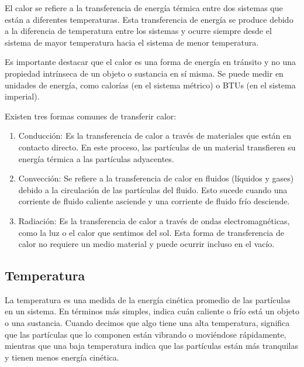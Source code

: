 \documentclass[letterpaper, 12pt]{article}
\begin{document}
El calor se refiere a la transferencia de energía térmica
entre dos sistemas que están a diferentes temperaturas.
Esta transferencia de energía se produce debido a la
diferencia de temperatura entre los sistemas y ocurre
siempre desde el sistema de mayor temperatura hacia el
sistema de menor temperatura.

Es importante destacar que el calor es una forma de energía
en tránsito y no una propiedad intrínseca de un objeto o
sustancia en sí misma. Se puede medir en unidades de
energía, como calorías (en el sistema métrico) o BTUs (en
el sistema imperial).

Existen tres formas comunes de transferir calor:

\begin{enumerate}
      \item Conducción: Es la transferencia de calor a través de
            materiales que están en contacto directo. En este proceso,
            las partículas de un material transfieren su energía
            térmica a las partículas adyacentes.

      \item Convección: Se refiere a la transferencia de calor en
            fluidos (líquidos y gases) debido a la circulación de las
            partículas del fluido. Esto sucede cuando una corriente de
            fluido caliente asciende y una corriente de fluido frío
            desciende.

      \item Radiación: Es la transferencia de calor a través de ondas
            electromagnéticas, como la luz o el calor que sentimos del
            sol. Esta forma de transferencia de calor no requiere un
            medio material y puede ocurrir incluso en el vacío.
\end{enumerate}

\subsection{Temperatura}

La temperatura es una medida de la energía cinética
promedio de las partículas en un sistema. En términos más
simples, indica cuán caliente o frío está un objeto o una
sustancia. Cuando decimos que algo tiene una alta
temperatura, significa que las partículas que lo componen
están vibrando o moviéndose rápidamente, mientras que una
baja temperatura indica que las partículas están más
tranquilas y tienen menos energía cinética.
\end{document}
